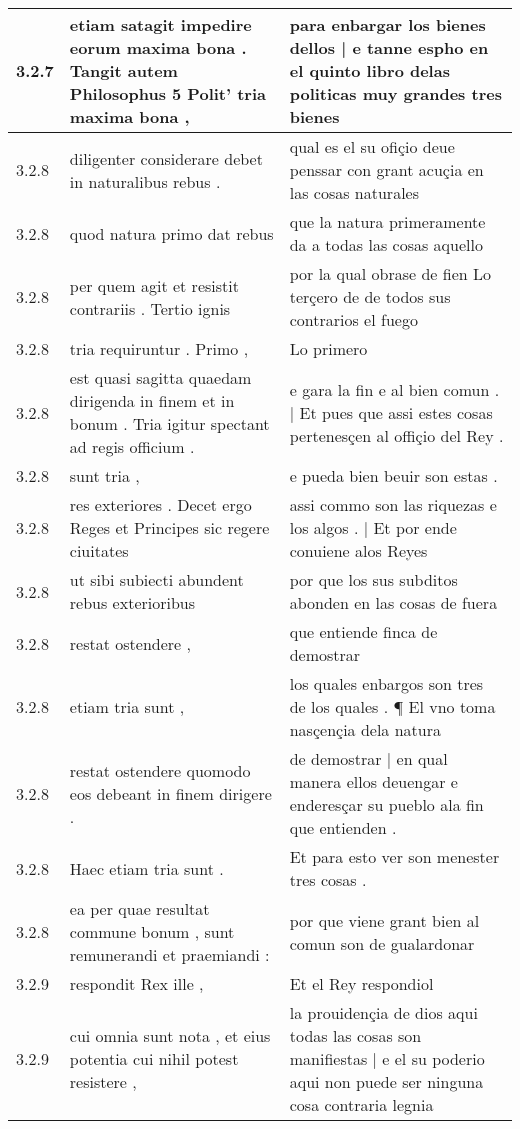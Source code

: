 \begin{tabular}{|p{1cm}|p{6.5cm}|p{6.5cm}|}
3.2.7 & etiam satagit impedire eorum maxima bona . Tangit autem Philosophus 5 Polit’ tria maxima bona , & para enbargar los bienes dellos | e tanne espho en el quinto libro delas politicas muy grandes tres bienes \\\hline
3.2.8 & diligenter considerare debet in naturalibus rebus . & qual es el su ofiçio deue penssar con grant acuçia en las cosas naturales \\\hline
3.2.8 & quod natura primo dat rebus & que la natura primeramente da a todas las cosas aquello \\\hline
3.2.8 & per quem agit et resistit contrariis . Tertio ignis & por la qual obrase de fien Lo terçero de de todos sus contrarios el fuego \\\hline
3.2.8 & tria requiruntur . Primo , & Lo primero \\\hline
3.2.8 & est quasi sagitta quaedam dirigenda in finem et in bonum . Tria igitur spectant ad regis officium . & e gara la fin e al bien comun . | Et pues que assi estes cosas pertenesçen al offiçio del Rey . \\\hline
3.2.8 & sunt tria , & e pueda bien beuir son estas . \\\hline
3.2.8 & res exteriores . Decet ergo Reges et Principes sic regere ciuitates & assi commo son las riquezas e los algos . | Et por ende conuiene alos Reyes \\\hline
3.2.8 & ut sibi subiecti abundent rebus exterioribus & por que los sus subditos abonden en las cosas de fuera \\\hline
3.2.8 & restat ostendere , & que entiende finca de demostrar \\\hline
3.2.8 & etiam tria sunt , & los quales enbargos son tres de los quales . ¶ El vno toma nasçençia dela natura \\\hline
3.2.8 & restat ostendere quomodo eos debeant in finem dirigere . & de demostrar | en qual manera ellos deuengar e enderesçar su pueblo ala fin que entienden . \\\hline
3.2.8 & Haec etiam tria sunt . & Et para esto ver son menester tres cosas . \\\hline
3.2.8 & ea per quae resultat commune bonum , sunt remunerandi et praemiandi : & por que viene grant bien al comun son de gualardonar \\\hline
3.2.9 & respondit Rex ille , & Et el Rey respondiol \\\hline
3.2.9 & cui omnia sunt nota , et eius potentia cui nihil potest resistere , & la prouidençia de dios aqui todas las cosas son manifiestas | e el su poderio aqui non puede ser ninguna cosa contraria legnia \\\hline

\end{tabular}
